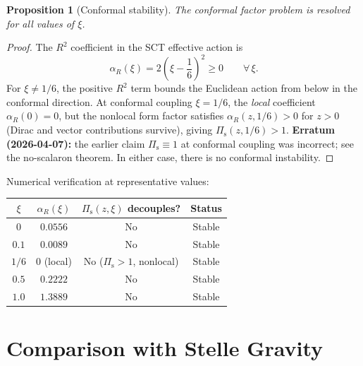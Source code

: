 \documentclass[11pt,a4paper]{article}
\newcommand{\Rsq}{R^2}
\newcommand{\Pis}{\Pi_{\mathrm{s}}}
\newtheorem{proposition}[theorem]{Proposition}
\begin{document}
\begin{proposition}[Conformal stability]
\label{prop:conformal}
The conformal factor problem is resolved for all values of $\xi$.
\end{proposition}

\begin{proof}
The $\Rsq$ coefficient in the SCT effective action is
\begin{equation}\label{eq:alpha-R}
  \alpha_R(\xi) = 2\!\left(\xi - \frac{1}{6}\right)^{\!2} \geq 0
  \qquad \forall\,\xi.
\end{equation}
For $\xi \neq 1/6$, the positive $\Rsq$ term bounds the Euclidean
action from below in the conformal direction.  At conformal coupling
$\xi = 1/6$, the \emph{local} coefficient $\alpha_R(0) = 0$, but the
nonlocal form factor satisfies $\alpha_R(z, 1/6) > 0$ for $z > 0$
(Dirac and vector contributions survive), giving $\Pis(z, 1/6) > 1$.
\textbf{Erratum (2026-04-07):} the earlier claim $\Pis \equiv 1$ at
conformal coupling was incorrect; see the no-scalaron theorem.
In either case, there is no conformal instability.
\end{proof}

Numerical verification at representative values:
\begin{center}
\begin{tabular}{cccc}
\toprule
$\xi$ & $\alpha_R(\xi)$ & $\Pis(z,\xi)$ decouples? & Status \\
\midrule
$0$ & $0.0556$ & No & Stable \\
$0.1$ & $0.0089$ & No & Stable \\
$1/6$ & $0$ (local) & No ($\Pis > 1$, nonlocal) & Stable \\
$0.5$ & $0.2222$ & No & Stable \\
$1.0$ & $1.3889$ & No & Stable \\
\bottomrule
\end{tabular}
\end{center}


\section{Comparison with Stelle Gravity}
\label{sec:stelle}
\end{document}
